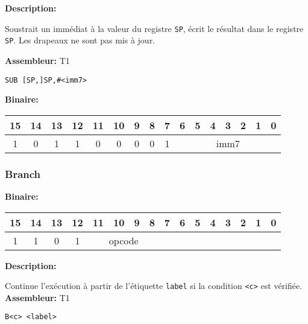
\textbf{Description: }

Soustrait un immédiat à la valeur du registre \texttt{SP}, écrit le résultat dans le registre \texttt{SP}.
Les drapeaux ne sont pas mis à jour.

\textbf{Assembleur:} T1

\begin{lstlisting}
SUB [SP,]SP,#<imm7>
\end{lstlisting}



\textbf{Binaire:}\\

\begin{tabular}{| c c c c c c c c c c c c c c c c |}
\hline
15 & 14 & 13 & 12 & \multicolumn{1}{|c}{11} & 10 & 9 & 8 & \multicolumn{1}{|c}{7} & \multicolumn{1}{|c}{6} & 5 & 4 & 3 & 2 & 1 & 0 \\
\hline
1 & 0 & 1 & 1 & \multicolumn{1}{|c}{0} & 0 & 0 & 0 & \multicolumn{1}{|c}{1} & \multicolumn{7}{|c|}{imm7} \\
\hline
\end{tabular}



\subsubsection{Branch}
\label{subsubsec:Branching}

\textbf{Binaire:}\\

\begin{tabular}{| c c c c c c c c c c c c c c c c |}
\hline
15 & 14 & 13 & 12 & \multicolumn{1}{|c}{11} & 10 & 9 & 8 & \multicolumn{1}{|c}{7} & 6 & 5 & 4 & 3 & 2 & 1 & 0 \\
\hline
1 & 1 & 0 & 1 & \multicolumn{4}{|c}{opcode} & \multicolumn{8}{|c|}{} \\
\hline
\end{tabular}

\label{subsubsubsec:CondBranch}

\textbf{Description: }

Continue l'exécution à partir de l'étiquette \texttt{label} si la condition \texttt{<c>} est vérifiée.\\

\textbf{Assembleur:} T1

\begin{lstlisting}
B<c> <label>
\end{lstlisting}

